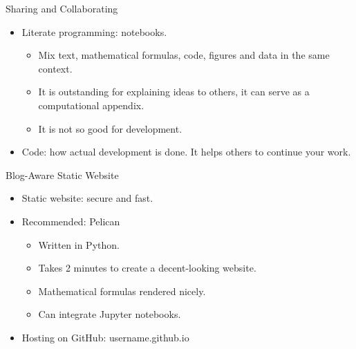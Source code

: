 \documentclass[compress,red]{beamer}\usetheme{Warsaw}\useoutertheme[subsection=false]{smoothbars}
\begin{document}
\begin{frame}{Sharing and Collaborating}
\begin{itemize}
\item Literate programming: notebooks.
\begin{itemize}
  \item Mix text, mathematical formulas, code, figures and data in the same context.
  \item It is outstanding for explaining ideas to others, it can serve as a computational appendix.
  \item It is not so good for development.
\end{itemize}
\item Code: how actual development is done. It helps others to continue your work.
\end{itemize}
\end{frame}

\begin{frame}{Blog-Aware Static Website}
\begin{itemize}
  \item Static website: secure and fast.
  \item Recommended: Pelican
  \begin{itemize}
     \item Written in Python.
     \item Takes 2 minutes to create a decent-looking website.
     \item Mathematical formulas rendered nicely.
     \item Can integrate Jupyter notebooks.
  \end{itemize}
  \item Hosting on GitHub: username.github.io
\end{itemize}
\end{frame}
\end{document}
